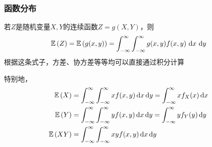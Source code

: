 \subsubsection{函数分布}
若$Z$是随机变量$X,Y$的连续函数$Z=g(X,Y)$，则
\[\mathbb{E}\left(Z\right)=\mathbb{E}\left(g(x,y)\right)=\displaystyle\int_{-\infty}^{\infty}{\displaystyle\int_{-\infty}^{\infty}{g(x,y)f(x,y)}\,\,\mathrm{d} x}\,\,\mathrm{d} y\]
根据这条式子，方差、协方差等等均可以直接通过积分计算

特别地，
\[\begin{aligned}
\mathbb{E}\left(X\right)&=\int_{-\infty}^\infty\int_{-\infty}^\infty xf(x,y)\,\mathrm{d} x\,\mathrm{d} y=\int_{-\infty}^\infty xf_X(x)\,\mathrm{d} x\\
\mathbb{E}\left(Y\right)&=\int_{-\infty}^\infty\int_{-\infty}^\infty yf(x,y)\,\mathrm{d} x\,\mathrm{d} y=\int_{-\infty}^\infty yf_Y(y)\,\mathrm{d} y\\
\mathbb{E}\left(XY\right)&=\int_{-\infty}^\infty\int_{-\infty}^\infty xyf(x,y)\,\mathrm{d} x\,\mathrm{d} y\\
\end{aligned}\]

